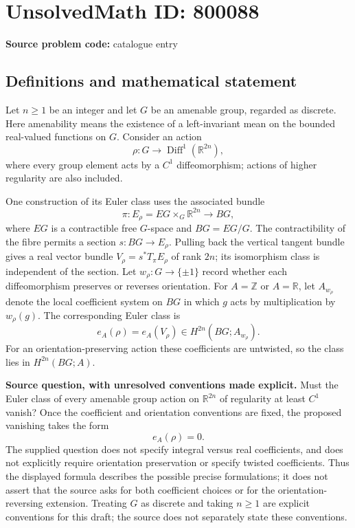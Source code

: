 \documentclass[11pt]{article}
\newcommand{\Z}{\mathbb{Z}}
\newcommand{\R}{\mathbb{R}}
\begin{document}
\section*{UnsolvedMath ID: 800088}
\textbf{Source problem code:} catalogue entry
\subsection{Definitions and mathematical statement}
Let \(n\geq 1\) be an integer and let \(G\) be an amenable group, regarded as discrete. Here amenability means the existence of a left-invariant mean on the bounded real-valued functions on \(G\). Consider an action
\[
\rho\colon G\longrightarrow \operatorname{Diff}^{1}(\R^{2n}),
\]
where every group element acts by a \(C^1\) diffeomorphism; actions of higher regularity are also included.

One construction of its Euler class uses the associated bundle
\[
\pi\colon E_\rho=EG\times_G\R^{2n}\longrightarrow BG,
\]
where \(EG\) is a contractible free \(G\)-space and \(BG=EG/G\). The contractibility of the fibre permits a section \(s\colon BG\to E_\rho\). Pulling back the vertical tangent bundle gives a real vector bundle \(V_\rho=s^*T_\pi E_\rho\) of rank \(2n\); its isomorphism class is independent of the section. Let \(w_\rho\colon G\to\{\pm1\}\) record whether each diffeomorphism preserves or reverses orientation. For \(A=\Z\) or \(A=\R\), let \(A_{w_\rho}\) denote the local coefficient system on \(BG\) in which \(g\) acts by multiplication by \(w_\rho(g)\). The corresponding Euler class is
\[
e_A(\rho)=e_A(V_\rho)\in H^{2n}(BG;A_{w_\rho}).
\]
For an orientation-preserving action these coefficients are untwisted, so the class lies in \(H^{2n}(BG;A)\).

\textbf{Source question, with unresolved conventions made explicit.} Must the Euler class of every amenable group action on \(\R^{2n}\) of regularity at least \(C^1\) vanish? Once the coefficient and orientation conventions are fixed, the proposed vanishing takes the form
\[
e_A(\rho)=0.
\]
The supplied question does not specify integral versus real coefficients, and does not explicitly require orientation preservation or specify twisted coefficients. Thus the displayed formula describes the possible precise formulations; it does not assert that the source asks for both coefficient choices or for the orientation-reversing extension. Treating \(G\) as discrete and taking \(n\geq1\) are explicit conventions for this draft; the source does not separately state these conventions.
\end{document}
